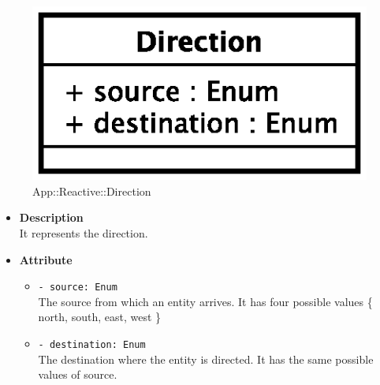 \begin{figure}[h]
\centering
\includegraphics[scale=0.6,keepaspectratio]{images/solution/direction.eps}
\caption{App::Reactive::Direction}
\label{fig:sd-app-direction}
\end{figure}
\FloatBarrier
\begin{itemize}
  \item \textbf{Description} \\
    It represents the direction. 
  \item \textbf{Attribute}
  \begin{itemize}
    \item \texttt{- source: Enum} \\
The source from which an entity arrives. It has four possible
values \{ north, south, east, west \}
    \item \texttt{- destination: Enum} \\
The destination where the entity is directed. It has the same possible
values of source.
  \end{itemize}
\end{itemize}
